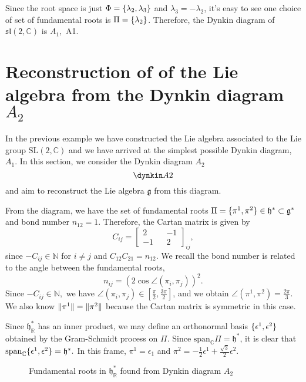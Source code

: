 Since the root space is just \(\Phi = \{\lambda_2, \lambda_3\}\) and \(\lambda_3 = -\lambda_2\), it's easy to see one choice of set of fundamental roots is \(\Pi = \{\lambda_2\}\). Therefore, the Dynkin diagram of \(\mathfrak{sl}(2,\mathbb{C})\) is \(A_1,\) \dynkin A1.

\section{Reconstruction of of the Lie algebra from the Dynkin diagram \texorpdfstring{\(A_2\)}{A2}}
In the previous example we have constructed the Lie algebra associated to the Lie group \(\mathrm{SL}(2,\mathbb{C})\) and we have arrived at the simplest possible Dynkin diagram, \(A_1\). In this section, we consider the Dynkin diagram \(A_2\)
\begin{equation*}
    \dynkin A2
\end{equation*}
and aim to reconstruct the Lie algebra \(\mathfrak{g}\) from this diagram.

From the diagram, we have the set of fundamental roots \(\Pi = \{\pi^1, \pi^2\} \in \mathfrak{h}^{\ast} \subset \mathfrak{g}^{\ast}\) and bond number \(n_{12} = 1.\) Therefore, the Cartan matrix is given by
\begin{equation*}
    C_{ij} = \begin{bmatrix}
        2 && -1\\
        -1 && 2
    \end{bmatrix}_{ij},
\end{equation*}
since \(-C_{ij} \in \mathbb{N}\) for \(i \neq j\) and \(C_{12} C_{21} = n_{12}.\) We recall the bond number is related to the angle between the fundamental roots,
\begin{equation*}
    n_{ij} = \left(2 \cos{\angle(\pi_i, \pi_j)}\right)^2.
\end{equation*}
Since \(-C_{ij} \in \mathbb{N},\) we have \(\angle(\pi_i,\pi_j) \in \left[\frac{\pi}{2}, \frac{3\pi}{2}\right]\), and we obtain \(\angle(\pi^1, \pi^2) = \frac{2\pi}{3}.\) We also know \(\lVert\pi^1\rVert = \lVert\pi^2\rVert\) because the Cartan matrix is symmetric in this case.

Since \(\mathfrak{h}_{\mathbb{R}}^{\ast}\) has an inner product, we may define an orthonormal basis \(\{\epsilon^1, \epsilon^2\}\) obtained by the Gram-Schmidt process on \(\Pi.\) Since \(\mathrm{span}_{\mathbb{C}}\Pi = \mathfrak{h}^{\ast}\), it is clear that \(\mathrm{span}_{\mathbb{C}}\{\epsilon^1, \epsilon^2\} = \mathfrak{h}^{\ast}.\) In this frame, \(\pi^1 = \epsilon_1\) and \(\pi^2 = -\frac{1}{2}\epsilon^1 + \frac{\sqrt{3}}{2}\epsilon^2\).
\begin{figure}[H]
    \centering
    \caption{Fundamental roots in \(\mathfrak{h}_{\mathbb{R}}^{\ast}\) found from Dynkin diagram \(A_2\)}
\end{figure}

